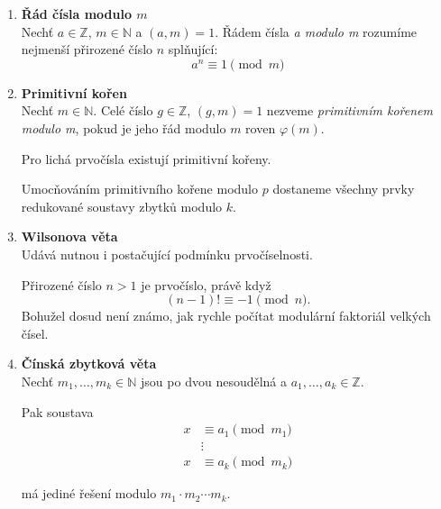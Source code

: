 \documentclass[12pt,a4paper]{article}
\begin{document}
\begin{enumerate}
	\item \textbf{Řád čísla modulo $m$}\\
		Nechť $a \in \mathbb{Z}$, $m \in \mathbb{N}$ a $(a,m) = 1$. Řádem čísla
		\textit{a modulo m} rozumíme nejmenší přirozené číslo $n$ splňující:
		\[ a^n \equiv 1 \pmod{m} \]

	\item \textbf{Primitivní kořen}\\
		Nechť $m \in \mathbb{N}$. Celé číslo $g \in \mathbb{Z}$, $(g,m) = 1$
		nezveme \textit{primitivním kořenem modulo m}, pokud je jeho řád modulo
		$m$ roven $\varphi(m)$.

		Pro lichá prvočísla existují primitivní kořeny.

		Umocňováním primitivního kořene modulo $p$ dostaneme všechny prvky
		redukované soustavy zbytků modulo $k$.

	\item \textbf{Wilsonova věta}\\
		Udává nutnou i postačující podmínku prvočíselnosti.

		Přirozené číslo $n > 1$ je prvočíslo, právě když
		\[ (n-1)! \equiv -1 \pmod{n}. \]
		Bohužel dosud není známo, jak rychle počítat modulární faktoriál velkých
		čísel.

	\item \textbf{Čínská zbytková věta}\\
		Nechť $m_1, \ldots, m_k \in \mathbb{N}$ jsou po dvou nesoudělná a
		$a_1, \ldots, a_k \in \mathbb{Z}$.

		Pak soustava
		\begin{align*}
			x &\equiv a_1 \pmod{m_1}\\
			&\vdots\\
			x &\equiv a_k \pmod{m_k}
		\end{align*}

		má jediné řešení modulo $m_1 \cdot m_2 \cdots m_k$.

\end{enumerate}
\end{document}
